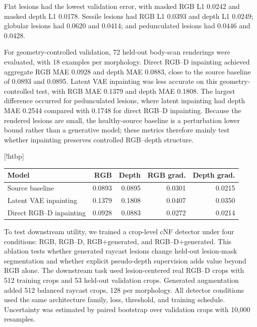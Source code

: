 \documentclass[runningheads]{llncs}
\makeatletter
\renewenvironment{table}
               {\setlength\abovecaptionskip{10\p@}%
                \setlength\belowcaptionskip{0\p@}%
                \@float{table}}
               {\end@float}
\makeatother
\begin{document}
Flat lesions had the lowest validation error, with masked RGB L1 0.0242 and masked depth L1 0.0178. Sessile lesions had RGB L1 0.0393 and depth L1 0.0249; globular lesions had 0.0620 and 0.0414; and pedunculated lesions had 0.0446 and 0.0428.

For geometry-controlled validation, 72 held-out body-scan renderings were evaluated, with 18 examples per morphology. Direct RGB--D inpainting achieved aggregate RGB MAE 0.0928 and depth MAE 0.0883, close to the source baseline of 0.0893 and 0.0895. Latent VAE inpainting was less accurate on this geometry-controlled test, with RGB MAE 0.1379 and depth MAE 0.1808. The largest difference occurred for pedunculated lesions, where latent inpainting had depth MAE 0.2544 compared with 0.1748 for direct RGB--D inpainting. Because the rendered lesions are small, the healthy-source baseline is a perturbation lower bound rather than a generative model; these metrics therefore mainly test whether inpainting preserves controlled RGB--depth structure.

\begin{table}[!htbp]
\centering
\small
\setlength{\tabcolsep}{5pt}
\begin{tabular}{lrrrr}
\toprule
Model & RGB & Depth & RGB grad. & Depth grad. \\
\midrule
Source baseline & 0.0893 & 0.0895 & 0.0301 & 0.0215 \\
Latent VAE inpainting & 0.1379 & 0.1808 & 0.0407 & 0.0350 \\
Direct RGB--D inpainting & 0.0928 & 0.0883 & 0.0272 & 0.0214 \\
\bottomrule
\end{tabular}
\caption{Masked geometry-controlled validation on held-out body-scan renderings. Lower values are better.}
\label{tab:hsr}
\end{table}

To test downstream utility, we trained a crop-level cNF detector under four conditions: RGB, RGB--D, RGB+generated, and RGB--D+generated. This ablation tests whether generated raycast lesions change held-out lesion-mask segmentation and whether explicit pseudo-depth supervision adds value beyond RGB alone. The downstream task used lesion-centered real RGB--D crops with 512 training crops and 53 held-out validation crops. Generated augmentation added 512 balanced raycast crops, 128 per morphology. All detector conditions used the same architecture family, loss, threshold, and training schedule. Uncertainty was estimated by paired bootstrap over validation crops with 10,000 resamples.
\end{document}

